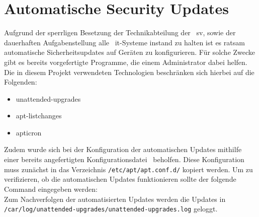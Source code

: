 
\section{Automatische Security Updates}\label{sec:automatische-security-updates}
Aufgrund der sperrligen Besetzung der Technikabteilung der ~\gls{sv}, sowie der dauerhaften Aufgabenstellung alle ~\gls{it}-Systeme instand zu halten ist es ratsam automatische
Sicherheitsupdates auf Geräten zu konfigurieren.
Für solche Zwecke gibt es bereits vorgefertigte Programme, die einem Administrator dabei helfen. \\
Die in diesem Projekt verwendeten Technologien beschränken sich hierbei auf die Folgenden:
\begin{itemize}
    \item unattended-upgrades
    \item apt-listchanges
    \item apticron
\end{itemize}

Zudem wurde sich bei der Konfiguration der automatischen Updates mithilfe einer bereits angefertigten Konfigurationsdatei~\cite{auto-update-config} beholfen.
Diese Konfiguration muss zunächst in das Verzeichnis \texttt{/etc/apt/apt.conf.d/} kopiert werden.
Um zu verifizieren, ob die automatischen Updates funktionieren sollte der folgende Command eingegeben werden:
\\
Zum Nachverfolgen der automatisierten Updates werden die Updates in \texttt{/car/log/unattended-upgrades/unattended-upgrades.log} geloggt.
